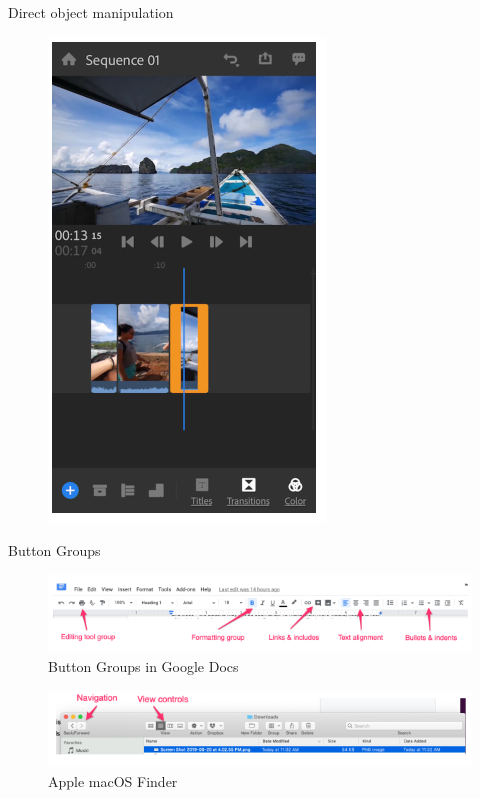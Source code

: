 \documentclass{beamer}
\begin{document}
\begin{frame}[t]{Direct object manipulation}
	\begin{figure}[h]
		\centering
		\includegraphics[scale=0.5]{images/lec08-pic01.png}
	\end{figure}
\end{frame}	

\begin{frame}[t]{Button Groups}
	\begin{figure}[h]
		\centering
		\includegraphics[scale=0.6]{images/lec08-pic02.png}
		\caption{Button Groups in Google Docs}
	\end{figure}
	\begin{figure}[h]
		\centering
		\includegraphics[scale=0.6]{images/lec08-pic03.png}
		\caption{Apple macOS Finder}
	\end{figure}	
\end{frame}	
\end{document}
